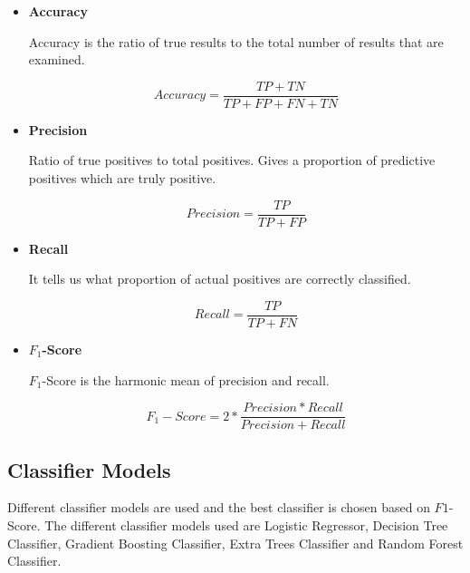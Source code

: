 \documentclass[12pt,letter-paper]{article}
\begin{document}
        \begin{itemize}
            \item\textbf{Accuracy}
            
                 Accuracy is the ratio of true results to the total number of results that are examined.
             
                \[Accuracy = \frac{TP + TN }{TP + FP + FN + TN}\]
                
            
            \item\textbf{Precision}
            
                Ratio of true positives to total positives. Gives a proportion of predictive positives which are truly positive.
            
                \[Precision = \frac{TP}{TP + FP}\]
            
            \item\textbf{Recall}
            
                It tells us what proportion of actual positives are correctly classified.
            
                \[Recall = \frac{TP}{TP + FN}\]
            
            \item\textbf{$F_1$-Score}
            
                $F_1$-Score is the harmonic mean of precision and recall.
            
                \[F_1-Score = 2 * \frac{Precision * Recall}{Precision + Recall}\]
            
        \end{itemize}
        
    \subsection{Classifier Models}
    
        Different classifier models are used and the best classifier is chosen based on $F1$-Score. The different classifier models used are Logistic Regressor, Decision Tree Classifier, Gradient Boosting Classifier, Extra Trees Classifier and Random Forest Classifier.
    
\end{document}
